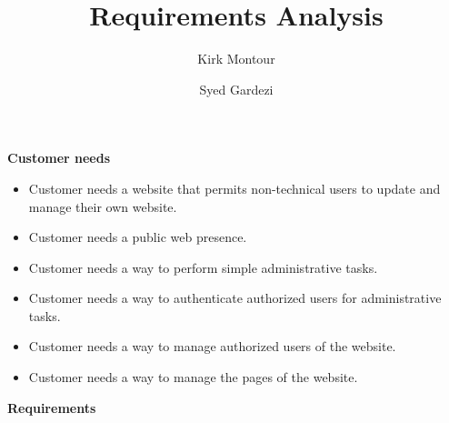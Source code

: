 \documentclass[11pt]{article}
\begin{document}
\title{Requirements Analysis}
\author{Kirk Montour\\ \and Syed Gardezi}


\date{\vspace{-5ex}}

\maketitle
\vspace{15 mm}
\textbf{Customer needs}

\begin{itemize}
\item Customer needs a website that permits non-technical users to update and manage their own website.
\item Customer needs a public web presence.
\item Customer needs a way to perform simple administrative tasks.
\item Customer needs a way to authenticate authorized users for administrative tasks.
\item Customer needs a way to manage authorized users of the website.
\item Customer needs a way to manage the pages of the website.
\end{itemize}

\vspace{10 mm}
\textbf{Requirements}
\end{document}
